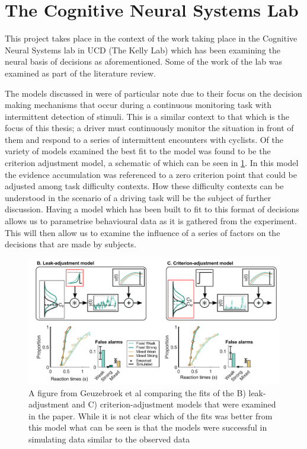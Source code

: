 \section{The Cognitive Neural Systems Lab}
This project takes place in the context of the work taking place in the Cognitive Neural Systems lab in UCD (The Kelly Lab) which has been examining the neural basis of decisions as aforementioned. Some of the work of the lab was examined as part of the literature review.

The models discussed in \citet{geuzebroekBalancingTrueFalse2023} were of particular note due to their focus on the decision making mechanisms that occur during a continuous monitoring task with intermittent detection of stimuli. This is a similar context to that which is the focus of this thesis; a driver must continuously monitor the situation in front of them and respond to a series of intermittent encounters with cyclists. Of the variety of models examined the best fit to the model was found to be the criterion adjustment model, a schematic of which can be seen in \ref{fig:Anna}. In this model the evidence accumulation was referenced to a zero criterion point that could be adjusted among task difficulty contexts. How these difficulty contexts can be understood in the scenario of a driving task will be the subject of further discussion.
Having a model which has been built to fit to this format of decisions allows us to parametrise behavioural data as it is gathered from the experiment. This will then allow us to examine the influence of a series of factors on the decisions that are made by subjects.
\begin{figure}[H]
    \centering
    \includegraphics[width=0.75\linewidth]{figures/Anna.PNG}
    \caption{A figure from Geuzebroek et al comparing the fits of the B) leak-adjustment and C) criterion-adjustment models that were examined in the paper. While it is not clear which of the fits was better from this model what can be seen is that the models were successful in simulating data similar to the observed data \citep{geuzebroekBalancingTrueFalse2023}}
    \label{fig:Anna}
\end{figure}